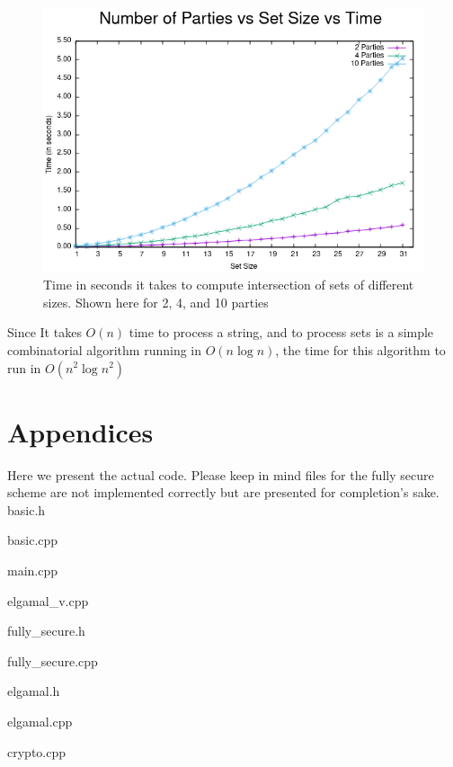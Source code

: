 \documentclass[10pt]{article}
\begin{document}
\begin{figure}[ht!]
\centering
\includegraphics[scale=0.64]{g6} 
\caption{Time in seconds it takes to compute intersection of sets of different sizes. Shown here for 2, 4, and 10 parties}
\end{figure}

Since It takes $O(n)$ time to process a string, and to process sets is a simple combinatorial algorithm running in $O(n\log n)$, the time for this algorithm to run in $O(n^2 \log n^2)$




\section{Appendices}
Here we present the actual code. Please keep in mind files for the fully secure scheme are not implemented correctly but are presented for completion's sake.\\
basic.h

basic.cpp

main.cpp

elgamal\_v.cpp

fully\_secure.h

fully\_secure.cpp

elgamal.h

elgamal.cpp

crypto.cpp



\end{document}

